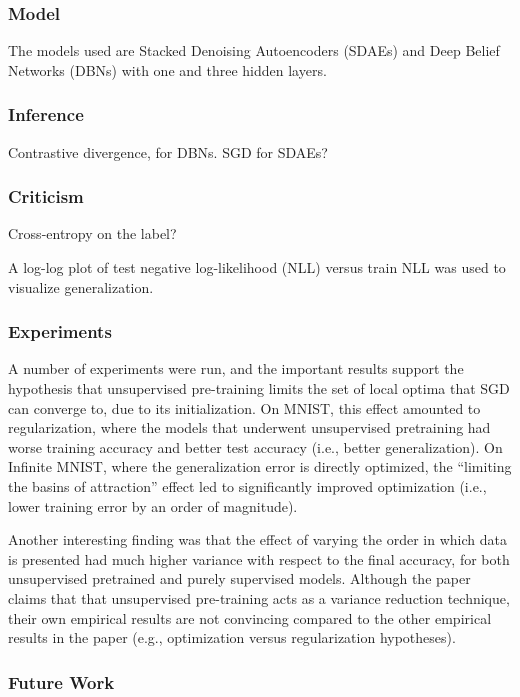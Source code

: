 \documentclass[a4paper, 12pt]{article}
\begin{document}
\subsubsection{Model}

The models used are Stacked Denoising Autoencoders (SDAEs) and Deep Belief
Networks (DBNs) with one and three hidden layers.


\subsubsection{Inference}

Contrastive divergence, for DBNs. SGD for SDAEs?


\subsubsection{Criticism}

Cross-entropy on the label?

A log-log plot of test negative log-likelihood (NLL) versus train NLL was used
to visualize generalization.


\subsubsection{Experiments}

A number of experiments were run, and the important results support the
hypothesis that unsupervised pre-training limits the set of local optima that
SGD can converge to, due to its initialization. On MNIST, this effect amounted
to regularization, where the models that underwent unsupervised pretraining had
worse training accuracy and better test accuracy (i.e., better generalization).
On Infinite MNIST, where the generalization error is directly optimized, the
``limiting the basins of attraction'' effect led to significantly improved
optimization (i.e., lower training error by an order of magnitude).

Another interesting finding was that the effect of varying the order in which
data is presented had much higher variance with respect to the final accuracy,
for both unsupervised pretrained and purely supervised models. Although the
paper claims that that unsupervised pre-training acts as a variance reduction
technique, their own empirical results are not convincing compared to the other
empirical results in the paper (e.g., optimization versus regularization
hypotheses).


\subsubsection{Future Work}
\end{document}

